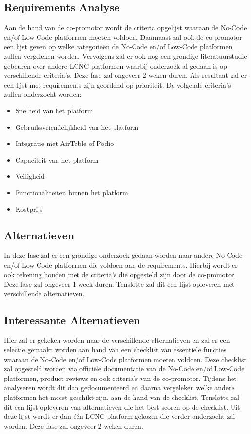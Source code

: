\subsection*{Requirements Analyse}
\label{sub:requirements-analyse}
Aan de hand van de co-promotor wordt de criteria opgelijst waaraan de No-Code en/of Low-Code platformen moeten voldoen.
Daarnaast zal ook de co-promotor een lijst geven op welke categorieën de No-Code en/of Low-Code platformen zullen vergeleken worden. 
Vervolgens zal er ook nog een grondige literatuurstudie gebeuren over andere LCNC platformen waarbij onderzoek al gedaan is op verschillende
criteria's. Deze fase zal ongeveer 2 weken duren. Als resultaat zal er een lijst met requirements zijn geordend op prioriteit.
De volgende criteria's zullen onderzocht worden:
\begin{itemize}
  \item Snelheid van het platform
  \item Gebruiksvriendelijkheid van het platform
  \item Integratie met AirTable of Podio
  \item Capaciteit van het platform
  \item Veiligheid
  \item Functionaliteiten binnen het platform
  \item Kostprijs
\end{itemize}

\subsection*{Alternatieven}
\label{sub:alternatieven}
In deze fase zal er een grondige onderzoek gedaan worden 
naar andere No-Code en/of Low-Code platformen die voldoen aan de requirements. 
Hierbij wordt er ook rekening houden met de criteria's die opgesteld zijn door de co-promotor. 
Deze fase zal ongeveer 1 week duren. Tenslotte zal dit een lijst opleveren met verschillende alternatieven.

\subsection*{Interessante Alternatieven}
\label{sub:interessante-alternatieven}
Hier zal er gekeken worden naar de verschillende alternatieven en zal er een selectie gemaakt worden aan hand van een checklist van essentiële functies waaraan de No-Code en/of Low-Code platformen moeten voldoen.
Deze checklist zal opgesteld worden via officiële documentatie van de No-Code en/of Low-Code platformen, product reviews en ook criteria's van de co-promotor.
Tijdens het analyseren wordt dit dan gedocumenteerd en daarna vergeleken welke andere platformen het meest geschikt zijn, aan de hand van de checklist.
Tenslotte zal dit een lijst opleveren van alternatieven die het best scoren op de checklist. Uit deze lijst wordt er dan één LCNC platform gekozen die verder onderzocht zal worden.
Deze fase zal ongeveer 2 weken duren.

